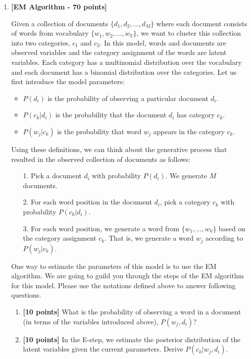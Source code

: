 \begin{enumerate}
  \item {\bf [EM Algorithm - 70 points]}

    Given a collection of documents $\{d_1, d_2, \dots , d_M\}$ where each 
    document consists of words from vocabulary 
    $\{w_1, w_2, \dots, w_V\}$, we want to cluster this collection into two 
    categories, $c_1$ and $c_2$. 
    In this model, words and documents are observed variables and the category assignment of the
    words are latent variables. Each category has a multinomial distribution 
    over the vocabulary and each document has a binomial distribution over the
    categories. Let us first introduce the model parameters:

    \begin{itemize}
      \item $P(d_i)$ is the probability of observing a particular document $d_i$.
      \item $P(c_k | d_i)$ is the probability that the document $d_i$ has 
        category $c_k$.
      \item $P(w_j| c_k)$ is the probability that word $w_j$ appears in the category $c_k$.
    \end{itemize}


    Using these definitions, we can think about the generative process that 
    resulted in the observed collection of documents as follows:

    \begin{enumerate}
      \item[1.] Pick a document $d_i$ with probability $P(d_i)$. We generate 
        $M$ documents.
      \item[2.] For each word position in the document $d_i$, pick a category $c_k$ with probability $P(c_k | d_i)$.
      \item[3.] For each word position, we generate a word from 
        $\{w_1, \dots, w_V\}$ based on the category assignment $c_k$. That is, we generate a word $w_j$ according to 
        $P(w_j | c_k)$.
    \end{enumerate}

    One way to estimate the parameters of this model is to use the EM algorithm. We 
    are going to guild you through the steps of the EM algorithm for this model. Please 
    use the notations defined above to answer following questions.

    \begin{enumerate}
      \item {\bf [10 points]}
        What is the probability of observing a word in a document (in terms 
        of the variables introduced above), 
        $P(w_j, d_i)$? 
      \item  {\bf [10 points]}
        In the E-step, we estimate the posterior distribution of the latent variables given
        the current parameters. Derive $P(c_k | w_j, d_i)$.


\end{enumerate}
\end{enumerate}
